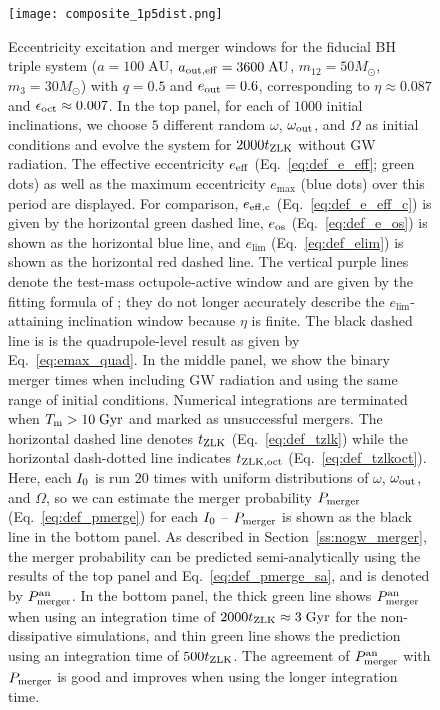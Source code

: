 \documentclass[
        fleqn,
        usenatbib,
    ]{mnras}
\begin{document}
\begin{figure}
    \centering
    \texttt{[image: composite\_1p5dist.png]}
    \caption{Eccentricity excitation and merger windows for the fiducial BH
    triple system ($a = 100\;\mathrm{AU}$, $a_{\rm out, eff} =
    3600\;\mathrm{AU}$, $m_{12} = 50M_{\odot}$, $m_3 = 30M_{\odot}$) with $q =
    0.5$ and $e_{\rm out} = 0.6$, corresponding to $\eta \approx 0.087$ and
    $\epsilon_{\rm oct} \approx 0.007$. In the top panel, for each of $1000$
    initial inclinations, we choose $5$ different random $\omega$, $\omega_{\rm
    out}$, and $\Omega$ as initial conditions and evolve the system for
    $2000t_{\rm ZLK}$ without GW radiation. The effective eccentricity $e_{\rm
    eff}$ (Eq.~\ref{eq:def_e_eff}; green dots) as well as the maximum
    eccentricity $e_{\max}$ (blue dots) over this period are displayed. For
    comparison, $e_{\rm eff, c}$ (Eq.~\ref{eq:def_e_eff_c}) is given by the
    horizontal green dashed line, $e_{\rm os}$ (Eq.~\ref{eq:def_e_os}) is shown
    as the horizontal blue line, and $e_{\lim}$ (Eq.~\ref{eq:def_elim}) is shown
    as the horizontal red dashed line. The vertical purple lines denote the
    test-mass octupole-active window and are given by the fitting formula of
    \citet{MLL16}; they do not longer accurately describe the
    $e_{\lim}$-attaining inclination window because $\eta$ is finite. The black
    dashed line is is the quadrupole-level result as given by
    Eq.~\eqref{eq:emax_quad}. In the middle panel, we show the binary merger
    times when including GW radiation and using the same range of initial
    conditions. Numerical integrations are terminated when $T_{\rm m} >
    10\;\mathrm{Gyr}$ and marked as unsuccessful mergers. The horizontal dashed
    line denotes $t_{\rm ZLK}$ (Eq.~\ref{eq:def_tzlk}) while the horizontal
    dash-dotted line indicates $t_{\rm ZLK, oct}$ (Eq.~\ref{eq:def_tzlkoct}).
    Here, each $I_{\rm 0}$ is run $20$ times with uniform distributions of
    $\omega$, $\omega_{\rm out}$, and $\Omega$, so we can estimate the merger
    probability $P_{\rm merger}$ (Eq.~\ref{eq:def_pmerge}) for each $I_{\rm
    0}$ -- $P_{\rm merger}$ %
    is shown as the black line in the bottom panel. As described in
    Section~\ref{ss:nogw_merger}, the merger probability can be predicted
    semi-analytically using the results of the top panel and
    Eq.~\eqref{eq:def_pmerge_sa}, and is denoted by $P_{\rm merger}^{\rm an}$.
    In the bottom panel, the thick green line shows $P_{\rm merger}^{\rm an}$
    when using an integration time of $2000 t_{\rm ZLK} \approx 3\;\mathrm{Gyr}$
    for the non-dissipative simulations, and thin green line shows the
    prediction using an integration time of $500 t_{\rm ZLK}$. The agreement of
    $P_{\rm merger}^{\rm an}$ with $P_{\rm merger}$ is good and improves when
    using the longer integration time. }\label{fig:composite_dist}
\end{figure}
\end{document}
